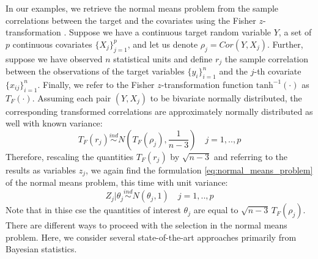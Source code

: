 \documentclass[american,]{article}
\theoremstyle{definition}
\begin{document}
In our examples, we retrieve the normal means problem from the sample correlations between the target and the covariates using the Fisher $z$-transformation \citep{hawkins1989using}. Suppose we have a continuous target random variable $Y$, a set of $p$ continuous covariates $\{X_{j}\}_{j=1}^{p}$, and let us denote $\rho_{j}=Cor(Y,X_{j})$. Further, suppose we have observed $n$ statistical units and define $r_{j}$ the sample correlation between the observations of the target variables $\{y_{i}\}_{i=1}^{n}$ and the $j$-th covariate $\{x_{ij}\}_{i=1}^{n}$. Finally, we refer to the Fisher $z$-transformation function $\text{tanh}^{-1}(\cdot)$ as $T_{F}(\cdot)$. Assuming each pair $(Y,X_{j})$ to be bivariate normally distributed, the corresponding transformed correlations are approximately normally distributed as well with known variance:
\
\begin{equation} \label{eq:fisher_transformation}
T_{F}(r_{j})\overset{ind}{\sim} N(T_{F}(\rho_{j}),\frac{1}{n-3}) \quad j=1,..,p
\end{equation}
Therefore, rescaling the quantities $T_{F}(r_{j})$ by $\sqrt{n-3}$ and referring to the results as variables $z_{j}$, we again find the formulation \eqref{eq:normal_means_problem} of the normal means problem, this time with unit variance:
\
\begin{equation} \label{eq:normal_means_problem2}
Z_{j}|\theta_{j}\overset{ind}{\sim}N(\theta_{j},1) \quad j=1,..,p
\end{equation}
Note that in thise cse the quantities of interest $\theta_{j}$ are equal to $\sqrt{n-3}\,T_{F}(\rho_{j})$. There are different ways to proceed with the selection in the normal means problem. Here, we consider several state-of-the-art approaches primarily from Bayesian statistics.
\end{document}
